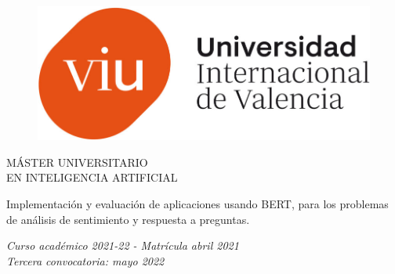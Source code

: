 \begin{figure}[H]
	\begin{center}
		\includegraphics[scale=0.25]{figuras/logo-viu.png}
	\end{center}
\end{figure}

\begin{center}
	\begin{bf}
		{\large MÁSTER UNIVERSITARIO\\EN INTELIGENCIA ARTIFICIAL}\\
	\end{bf}
	\vspace*{5cm}
	
	\begin{bf}
		{\large Implementación y evaluación de aplicaciones usando BERT, para los problemas de análisis de sentimiento y respuesta a preguntas.} \\
	\end{bf}
	
	{\large \textit{Curso académico 2021-22 - Matrícula abril 2021}}\\
	{\large \textit{Tercera convocatoria: mayo 2022}}\\
	
	\vspace{5 cm}
\end{center}

%	
%	

